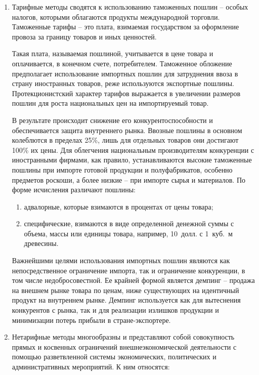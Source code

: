 \begin{enumerate}
    \item Тарифные методы сводятся к использованию таможенных пошлин -- особых
    налогов, которыми облагаются продукты международной торговли. Таможенные
    тарифы -- это плата, взимаемая государством за оформление провоза за
    границу товаров и иных ценностей.

    Такая плата, называемая пошлиной, учитывается в цене товара и оплачивается,
    в конечном счете, потребителем. Таможенное обложение предполагает
    использование импортных пошлин для затруднения ввоза в страну иностранных
    товаров, реже используются экспортные пошлины. Протекционистский характер
    тарифов выражается в увеличении размеров пошлин для роста национальных цен
    на импортируемый товар.
    
    В результате происходит снижение его конкурентоспособности и обеспечивается
    защита внутреннего рынка. Ввозные пошлины в основном колеблются в пределах
    25\%, лишь для отдельных товаров они достигают 100\% их цены. Для
    облегчения национальным производителям конкуренции с иностранными фирмами,
    как правило, устанавливаются высокие таможенные пошлины при импорте готовой
    продукции и полуфабрикатов, особенно предметов роскоши, а более низкие --
    при импорте сырья и материалов. По форме исчисления различают пошлины:
    \begin{enumerate}
        \item адвалорные, которые взимаются в процентах от цены товара;
        \item специфические, взимаются в виде определенной денежной суммы с
        объема, массы или единицы товара, например, 10~долл. с 1~куб.~м
        древесины.
    \end{enumerate}
    Важнейшими целями использования импортных пошлин являются как
    непосредственное ограничение импорта, так и ограничение конкуренции, в
    том числе недобросовестной. Ее крайней формой является демпинг -- продажа
    на внешнем рынке товара по ценам, ниже существующих на идентичный продукт
    на внутреннем рынке. Демпинг используется как для вытеснения конкурентов с
    рынка, так и для реализации излишков продукции и минимизации потерь прибыли
    в стране-экспортере.
    \item Нетарифные методы многообразны и представляют собой совокупность
    прямых и косвенных ограничений внешнеэкономической деятельности с помощью
    разветвленной системы экономических, политических и административных
    мероприятий. К ним относятся:

\end{enumerate}

